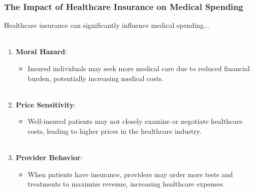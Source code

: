 \documentclass[notes,10pt, aspectratio=169]{beamer}
\begin{document}
\begin{frame}
\frametitle{The Impact of Healthcare Insurance on Medical Spending}
Healthcare insurance can significantly influence medical spending...\\\\[1em]

\begin{enumerate}
  \item \textbf{Moral Hazard}:
    \begin{itemize}
      \item Insured individuals may seek more medical care due to reduced financial burden, potentially increasing medical costs.\\\\[1em]
    \end{itemize}

  \item \textbf{Price Sensitivity}:
    \begin{itemize}
      \item Well-insured patients may not closely examine or negotiate healthcare costs, leading to higher prices in the healthcare industry.\\\\[1em]
    \end{itemize}

  \item \textbf{Provider Behavior}:
    \begin{itemize}
      \item When patients have insurance, providers may order more tests and treatments to maximize revenue, increasing healthcare expenses.\\\\[1em]
    \end{itemize}

\end{enumerate}
\end{frame}
\end{document}
